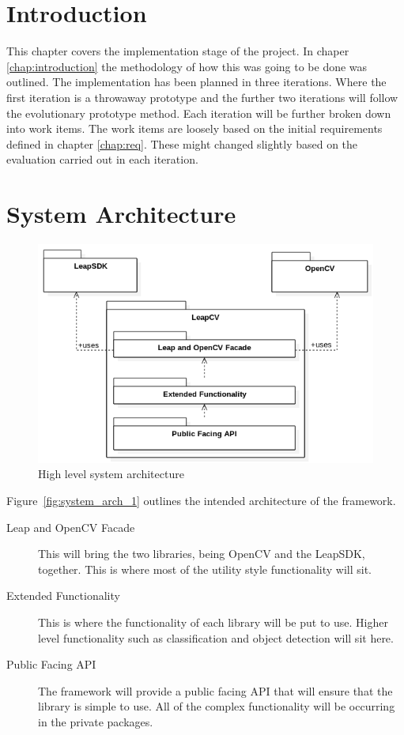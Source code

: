 \documentclass[11pt,oneside]{report}
\begin{document}
	\section{Introduction}
	This chapter covers the implementation stage of the project.
	In chaper \ref{chap:introduction} the methodology of how this was going to be done was outlined.
	The implementation has been planned in three iterations.
	Where the first iteration is a throwaway prototype and the further two iterations will follow the evolutionary prototype method.
	Each iteration will be further broken down into work items.
	The work items are loosely based on the initial requirements defined in chapter \ref{chap:req}.
	These might changed slightly based on the evaluation carried out in each iteration.
	\clearpage
	\section{System Architecture}
	\begin{figure}[ht]
			\begin{center}
    			\includegraphics[width=\textwidth]{system_architecture_2}
    			\caption{High level system architecture \protect {\label{fig:system_arch_1}}}
    		\end{center}
			\end{figure}	
			
			Figure~\ref{fig:system_arch_1} outlines the intended architecture of the framework.
			\begin{description}
			\item[Leap and OpenCV Facade] This will bring the two libraries, being OpenCV and the LeapSDK, together.
			This is where most of the utility style functionality will sit.
			\item[Extended Functionality] This is where the functionality of each library will be put to use.
			Higher level functionality such as classification and object detection will sit here.
			\item[Public Facing API] The framework will provide a public facing API that will ensure that the library is simple to use.
			All of the complex functionality will be occurring in the private packages.
			\end{description}
			\clearpage
\end{document}
